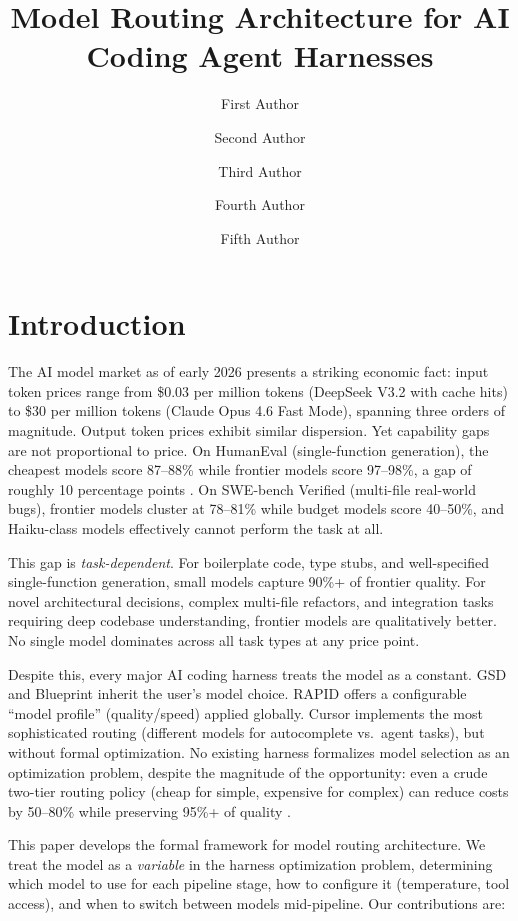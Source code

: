 \documentclass[11pt, a4paper, logo, copyright]{googledeepmind}
\title{Model Routing Architecture for AI Coding Agent Harnesses}
\author[1]{First Author}
\author[2]{Second Author}
\author[2]{Third Author}
\author[1]{Fourth Author}
\author[1]{Fifth Author}
\affil[]{Pragnition Labs}
\affil[*]{Equal Contribution}
\affil[1]{Affiliation 1}
\affil[2]{Affiliation 2}
\begin{document}
\maketitle

\section{Introduction}
\label{sec:intro}

The AI model market as of early 2026 presents a striking economic fact: input token prices range from \$0.03 per million tokens (DeepSeek V3.2 with cache hits) to \$30 per million tokens (Claude Opus 4.6 Fast Mode), spanning three orders of magnitude. Output token prices exhibit similar dispersion. Yet capability gaps are not proportional to price. On HumanEval (single-function generation), the cheapest models score 87--88\% while frontier models score 97--98\%, a gap of roughly 10 percentage points \citep{chen2021codex}. On SWE-bench Verified (multi-file real-world bugs), frontier models cluster at 78--81\% while budget models score 40--50\%, and Haiku-class models effectively cannot perform the task at all.

This gap is \emph{task-dependent}. For boilerplate code, type stubs, and well-specified single-function generation, small models capture 90\%+ of frontier quality. For novel architectural decisions, complex multi-file refactors, and integration tasks requiring deep codebase understanding, frontier models are qualitatively better. No single model dominates across all task types at any price point.

Despite this, every major AI coding harness treats the model as a constant. GSD and Blueprint inherit the user's model choice. RAPID offers a configurable ``model profile'' (quality/speed) applied globally. Cursor implements the most sophisticated routing (different models for autocomplete vs.\ agent tasks), but without formal optimization. No existing harness formalizes model selection as an optimization problem, despite the magnitude of the opportunity: even a crude two-tier routing policy (cheap for simple, expensive for complex) can reduce costs by 50--80\% while preserving 95\%+ of quality \citep{routellm2025}.

This paper develops the formal framework for model routing architecture. We treat the model as a \emph{variable} in the harness optimization problem, determining which model to use for each pipeline stage, how to configure it (temperature, tool access), and when to switch between models mid-pipeline. Our contributions are:
\end{document}
